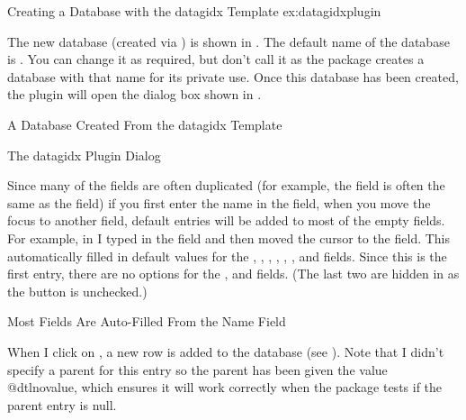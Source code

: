 \begin{example}
 {Creating a Database with the datagidx Template}
 {ex:datagidxplugin}

   The new database (created via ) is
   shown in . The default name of the database
   is . You can change it 
   as required, but don't call it  as the  
   package creates a database with that name for its private use.
   Once this database has been created, the  plugin will 
   open the dialog box shown in .

 {%
 }
 {A Database Created From the datagidx Template}

 {%
 }
 {The datagidx Plugin Dialog}

   Since many of the fields are often duplicated (for example, the 
    field is often the same as the  field)
   if you first enter the name in the 
   field, when you move the focus to another field, default entries will 
   be added to most of the empty fields. For example, in 
    I typed  in the
    field and then moved the cursor to
   the  field. This automatically
   filled in default values for the ,
   ,
   ,
   ,
   ,
   ,
    and
    fields.
   Since this is the first entry, there are no options for the
   ,
    and 
    fields. (The last two are hidden in
    as the 
   button is unchecked.)

 {%
 }
 {Most Fields Are Auto-Filled From the Name Field}

   When I click on , a new row is
   added to the database (see ). Note that
   I didn't specify a parent for this entry so the parent has
   been given the value \gls{@dtlnovalue}, which ensures it will work
   correctly when the  package tests if the parent entry
   is null.


\end{example}

